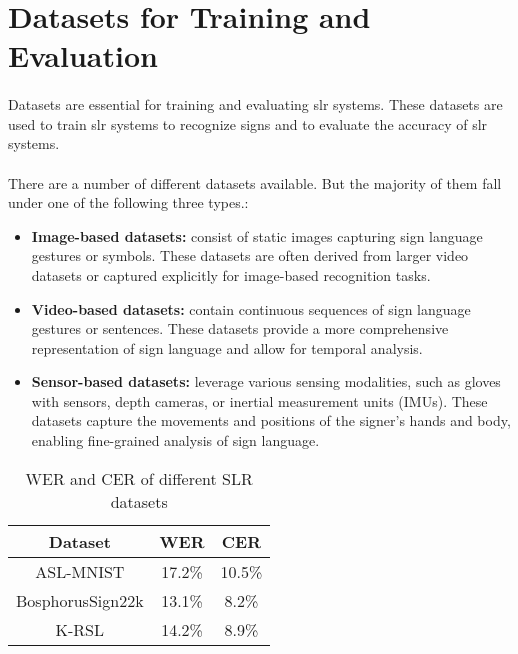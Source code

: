 \section{Datasets for Training and Evaluation}
\paragraph{}
Datasets are essential for training and evaluating \ac{slr} systems. These datasets are used to train \ac{slr} systems to recognize signs and to evaluate the accuracy of \ac{slr} systems.
\paragraph{}
There are a number of different datasets available. But the majority of them fall under one of the following three types.:
\begin{itemize}
	\item \textbf{Image-based datasets:} consist of static images capturing sign language gestures or symbols. These datasets are often derived from larger video datasets or captured explicitly for image-based recognition tasks.
	\item \textbf{Video-based datasets:} contain continuous sequences of sign language gestures or sentences. These datasets provide a more comprehensive representation of sign language and allow for temporal analysis.
	\item \textbf{Sensor-based datasets:} leverage various sensing modalities, such as gloves with sensors, depth cameras, or inertial measurement units (IMUs). These datasets capture the movements and positions of the signer's hands and body, enabling fine-grained analysis of sign language.
\end{itemize}
\begin{table}[ht]
	\centering
	\caption{WER and CER of different SLR datasets}
	\begin{tabular}{|c|c|c|}
		\hline
		Dataset & WER & CER \\ \hline
		ASL-MNIST & 17.2\% & 10.5\% \\ \hline
		BosphorusSign22k & 13.1\% & 8.2\% \\ \hline
		K-RSL & 14.2\% & 8.9\% \\ \hline
	\end{tabular}
\end{table}